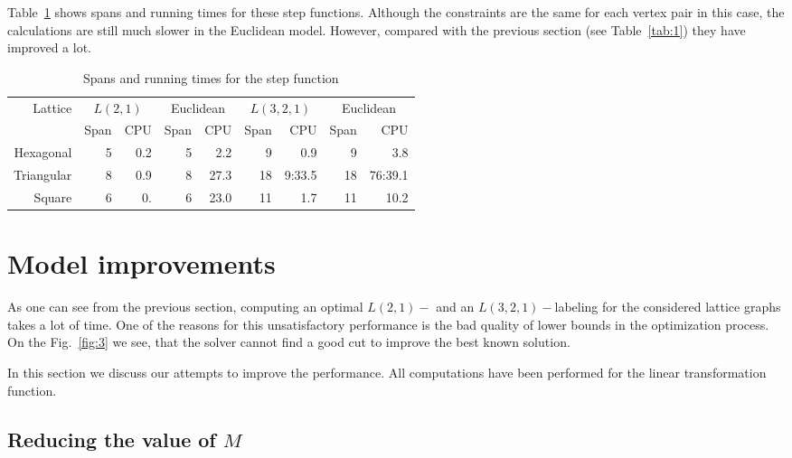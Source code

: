 \documentclass[smallextended]{svjour3}
\begin{document}
Table~\ref{tab:3} shows spans and running times for these step functions. 
Although the constraints are the same for each vertex pair in this case, the calculations 
are still much slower in the Euclidean model. However, compared with the 
previous section (see Table~\ref{tab:1}) they have improved a lot. 

\begin{table}[h] 
\begin{center} 
\renewcommand{\arraystretch}{1.3} 
\renewcommand{\tabcolsep}{8pt} 
\begin{tabular}{|r||r|r|r|r||r|r|r|r|} 
\hline 
Lattice  & \multicolumn{2}{c|}{$L(2,1)$} & \multicolumn{2}{c||}{Euclidean} & 
 \multicolumn{2}{c|}{$L(3,2,1)$} & \multicolumn{2}{c|}{Euclidean}\\ 
  & Span & CPU & Span & CPU & Span & CPU & Span & CPU\\ 
\hline 
Hexagonal & 5 & 0.2 & 5 & 2.2 & 9 & 0.9 & 9 & 3.8 \\ 
\hline 
Triangular  & 8 & 0.9 & 8 & 27.3 & 18 & 9:33.5 & 18 & 76:39.1 \\ 
\hline 
Square     & 6 & 0. & 6  & 23.0 & 11 & 1.7 & 11 & 10.2  \\ 
\hline 
\end{tabular} 
\end{center} 
\caption{Spans and running times for the step function}\label{tab:3} 
\end{table} 

\section{Model improvements} 

As one can see from the previous section, computing an optimal $L(2,1)-$ and an $L(3,2,1)-$labeling for the considered lattice graphs takes a lot of time. One of the reasons for this unsatisfactory performance is the bad quality of lower bounds in the optimization process. On the Fig.~\ref{fig:3} we see, that the solver cannot find a good cut to improve the best known solution.

In this section we discuss our attempts to improve the performance. All computations have been performed for the linear transformation function. 

 

\FloatBarrier 

\subsection{Reducing the value of $M$} 
\end{document}

